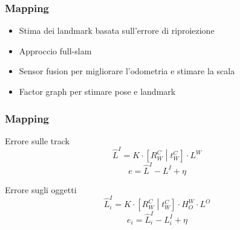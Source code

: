 \documentclass[c]{beamer}
\begin{document}

\begin{frame}
\frametitle{Mapping}

\begin{itemize}
 \item Stima dei landmark basata sull'errore di riproiezione
 \item Approccio full-slam
 \item Sensor fusion per migliorare l'odometria e stimare la scala
 \item Factor graph per stimare pose e landmark
\end{itemize}


\end{frame}


\begin{frame}
\frametitle{Mapping}

\begin{block}{Errore sulle track}
 \begin{equation*}
  \hat{L}^I =  K\cdot \left[  R^C_W \middle| t^C_W  \right] \cdot L^W
 \end{equation*}
 \begin{equation*}
  e = \hat{L}^I - L^I + \eta
 \end{equation*}
\end{block}
\vskip 1cm
\begin{block}{Errore sugli oggetti}
 \begin{equation*}
  \hat{L}^I_i =  K\cdot \left[  R^C_W \middle| t^C_W  \right] \cdot H^W_O \cdot L^O
 \end{equation*}
 \begin{equation*}
  e_i = \hat{L}^I_i - L^I_i + \eta
 \end{equation*}
\end{block}



\end{frame}
\end{document}

